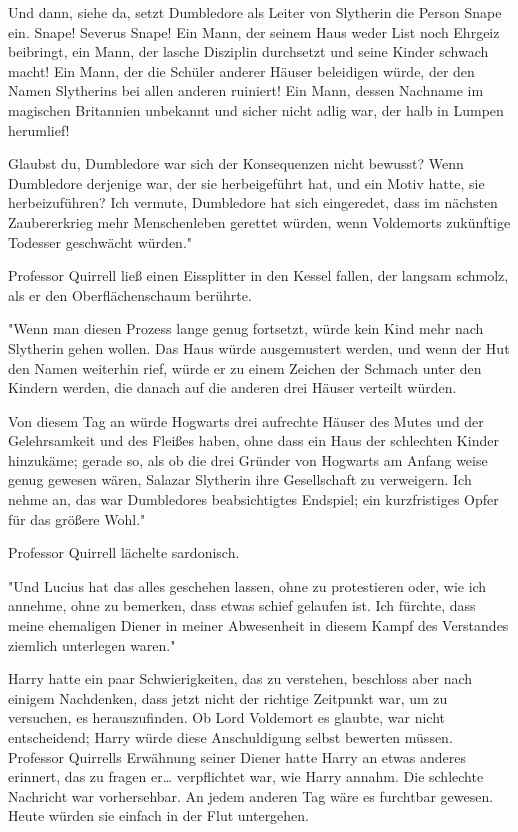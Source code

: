 {Und dann, siehe da, setzt Dumbledore als Leiter von Slytherin die Person Snape ein. Snape! Severus Snape! Ein Mann, der seinem Haus weder List noch Ehrgeiz beibringt, ein Mann, der lasche Disziplin durchsetzt und seine Kinder schwach macht! Ein Mann, der die Schüler anderer Häuser beleidigen würde, der den Namen Slytherins bei allen anderen ruiniert! Ein Mann, dessen Nachname im magischen Britannien unbekannt und sicher nicht adlig war, der halb in Lumpen herumlief!

Glaubst du, Dumbledore war sich der Konsequenzen nicht bewusst? Wenn Dumbledore derjenige war, der sie herbeigeführt hat, und ein Motiv hatte, sie herbeizuführen? Ich vermute, Dumbledore hat sich eingeredet, dass im nächsten Zaubererkrieg mehr Menschenleben gerettet würden, wenn Voldemorts zukünftige Todesser geschwächt würden."

Professor Quirrell ließ einen Eissplitter in den Kessel fallen, der langsam schmolz, als er den Oberflächenschaum berührte.

"Wenn man diesen Prozess lange genug fortsetzt, würde kein Kind mehr nach Slytherin gehen wollen. Das Haus würde ausgemustert werden, und wenn der Hut den Namen weiterhin rief, würde er zu einem Zeichen der Schmach unter den Kindern werden, die danach auf die anderen drei Häuser verteilt würden.

Von diesem Tag an würde Hogwarts drei aufrechte Häuser des Mutes und der Gelehrsamkeit und des Fleißes haben, ohne dass ein Haus der schlechten Kinder hinzukäme; gerade so, als ob die drei Gründer von Hogwarts am Anfang weise genug gewesen wären, Salazar Slytherin ihre Gesellschaft zu verweigern. Ich nehme an, das war Dumbledores beabsichtigtes Endspiel; ein kurzfristiges Opfer für das größere Wohl."

Professor Quirrell lächelte sardonisch.

"Und Lucius hat das alles geschehen lassen, ohne zu protestieren oder, wie ich annehme, ohne zu bemerken, dass etwas schief gelaufen ist. Ich fürchte, dass meine ehemaligen Diener in meiner Abwesenheit in diesem Kampf des Verstandes ziemlich unterlegen waren."

Harry hatte ein paar Schwierigkeiten, das zu verstehen, beschloss aber nach einigem Nachdenken, dass jetzt nicht der richtige Zeitpunkt war, um zu versuchen, es herauszufinden. Ob Lord Voldemort es glaubte, war nicht entscheidend; Harry würde diese Anschuldigung selbst bewerten müssen. Professor Quirrells Erwähnung seiner Diener hatte Harry an etwas anderes erinnert, das zu fragen er… verpflichtet war, wie Harry annahm. Die schlechte Nachricht war vorhersehbar. An jedem anderen Tag wäre es furchtbar gewesen. Heute würden sie einfach in der Flut untergehen.

}
